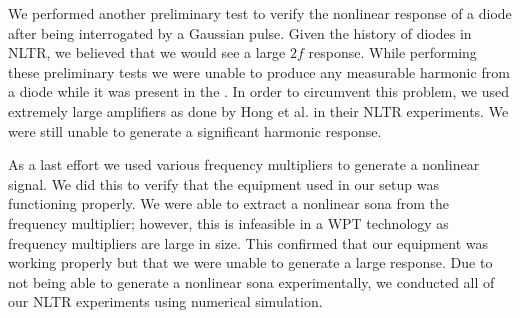 We performed another preliminary test to verify the nonlinear response of a diode after being interrogated by a Gaussian pulse. Given the history of diodes in NLTR, we believed that we would see a large $2f$ response. While performing these preliminary tests we were unable to produce any measurable harmonic from a diode while it was present in the \giga{}. In order to circumvent this problem, we used extremely large amplifiers as done by Hong et al. in their NLTR experiments. We were still unable to generate a significant harmonic response.

As a last effort we used various frequency multipliers to generate a nonlinear signal. We did this to verify that the equipment used in our setup was functioning properly. We were able to extract a nonlinear sona from the frequency multiplier; however, this is infeasible in a WPT technology as frequency multipliers are large in size. This confirmed that our equipment was working properly but that we were unable to generate a large response. Due to not being able to generate a nonlinear sona experimentally, we conducted all of our NLTR experiments using numerical simulation.
